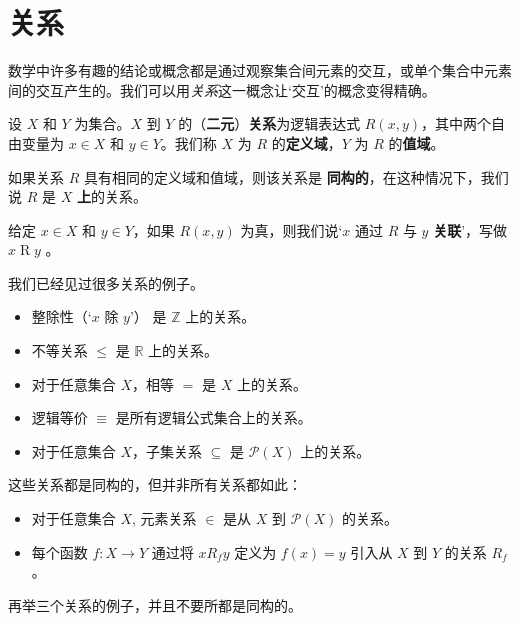 \section{关系}

数学中许多有趣的结论或概念都是通过观察集合间元素的交互，或单个集合中元素间的交互产生的。我们可以用\textit{关系}这一概念让`交互'的概念变得精确。

\begin{definition}
设 $X$ 和 $Y$ 为集合。$X$ 到 $Y$ 的（\textbf{二元}）\textbf{关系}为逻辑表达式 $R(x,y)$，其中两个自由变量为 $x \in X$ 和 $y \in Y$。我们称 $X$ 为 $R$ 的\textbf{定义域}，$Y$ 为 $R$ 的\textbf{值域}。

如果关系 $R$ 具有相同的定义域和值域，则该关系是 \textbf{同构的}，在这种情况下，我们说 $R$ 是 $X$ \textbf{上}的关系。

给定 $x \in X$ 和 $y \in Y$，如果 $R(x,y)$ 为真，则我们说`$x$ 通过 $R$ 与 $y$ \textbf{关联}'，写做 $x \mathrel{R} y$ 。
\end{definition}

\begin{example}
\label{exRelationExamples}
我们已经见过很多关系的例子。
\begin{itemize}
\item 整除性（`$x$ 除 $y$'） 是 $\mathbb{Z}$ 上的关系。
\item 不等关系 $\le$ 是 $\mathbb{R}$ 上的关系。
\item 对于任意集合 $X$，相等 $=$ 是 $X$ 上的关系。
\item 逻辑等价 $\equiv$ 是所有逻辑公式集合上的关系。
\item 对于任意集合 $X$，子集关系 $\subseteq$ 是 $\mathcal{P}(X)$ 上的关系。
\end{itemize}
这些关系都是同构的，但并非所有关系都如此：
\begin{itemize}
\item 对于任意集合 $X$, 元素关系 $\in$ 是从 $X$ 到 $\mathcal{P}(X)$ 的关系。
\item 每个函数 $f : X \to Y$ 通过将 $x \mathrel{R_f} y$ 定义为 $f(x) = y$ 引入从 $X$ 到 $Y$ 的关系 $R_f$。
\end{itemize}
\end{example}

\begin{exercise}
再举三个关系的例子，并且不要所都是同构的。
\end{exercise}

